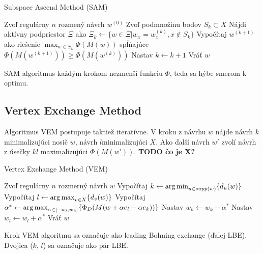 \begin{algorithm}[H]
	\caption{Subspace Ascend Method (SAM) \cite{rex_harman}}
	\label{sam}
	\begin{algorithmic}[1]
		\State Zvoľ regulárny $n$ rozmený návrh $w^{(0)}$
			\State Zvoľ podmnožinu bodov $S_k \subset X$
			\State Nájdi aktívny podpriestor $\Xi$ ako $\Xi_k \leftarrow \{ w \in \Xi | w_x = w_x^{(k)}, x \not \in S_k \}$
			\State Vypočítaj $w^{(k+1)}$ ako riešenie $\max_{w \in \Xi_k} \Phi(M(w))$ spĺňajúce $\Phi(M(w^{(k+1)})) \geq \Phi(M(w^{(k)}))$
			\State Nastav $k \leftarrow k+1$
		\EndWhile
		\State Vráť $w$
	\end{algorithmic}
\end{algorithm}

SAM algoritmus každým krokom nezmenší funkciu $\Phi$, teda sa hýbe smerom k optimu.

\subsection{Vertex Exchange Method}

Algoritmus VEM postupuje taktiež iteratívne. V kroku z návrhu $w$ nájde návrh $k$ minimalizujúci nosič $w$, návrh $l$minimalizujúci $X$. Ako ďalší návrh $w'$ zvolí návrh z úsečky $kl$ maximalizujúci $\Phi(M(w'))$. \textbf{TODO čo je X?}

\begin{algorithm}[H]
	\caption{Vertex Exchange Method (VEM) \cite{rex_harman}}
	\label{vem}
	\begin{algorithmic}[1]
		\State Zvoľ regulárny $n$ rozmerný návrh $w$
			\State Vypočítaj $k \leftarrow \operatorname*{arg\,min}_{u \in supp(w)} \{ d_u(w)\}$
			\State Vypočítaj $l \leftarrow \operatorname*{arg\,max}_{v \in X} \{ d_v(w)\}$
			\State Vypočítaj $\alpha^* \leftarrow \operatorname*{arg\,max}_{\alpha \in [-w_l, w_k]} \{ \Phi_D (M(w+\alpha e_l -\alpha e_k))\}$
			\State Nastav $w_k \leftarrow w_k - \alpha^*$
			\State Nastav $w_l \leftarrow w_l + \alpha^*$
		\EndWhile
		\State Vráť $w$
	\end{algorithmic}
\end{algorithm}

Krok VEM algoritmu sa označuje ako leading Bohning exchange (ďalej LBE). Dvojica ($k$, $l$) sa označuje ako pár LBE.
